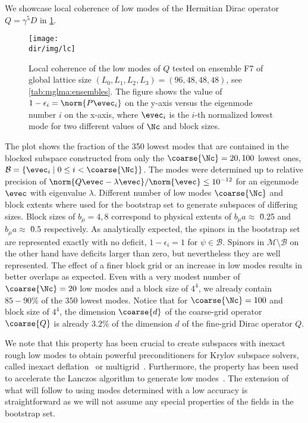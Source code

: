 We showcase local coherence of low modes of the Hermitian Dirac operator $Q = \gamma^{5} D$ in \cref{fig:lc}.
\begin{figure}
    \centering
    \texttt{[image: \\dir/img/lc]}
    \caption{Local coherence of the low modes of $Q$ tested on ensemble F7 of global lattice size $(L_0,L_1,L_2,L_3) = (96, 48, 48, 48)$, see \cref{tab:mglma:ensembles}. The figure shows the value of $1 - \epsilon_i = \norm{P \evec_i}$ on the y-axis versus the eigenmode number $i$ on the x-axis, where $\evec_i$ is the $i$-th normalized lowest mode for two different values of $\Nc$ and block sizes. \takenfull }
    \label{fig:lc}
\end{figure}
The plot shows the fraction of the \num{350} lowest modes that are contained in the blocked subspace constructed from only the $\coarse{\Nc} = 20, 100$ lowest ones, $\mathcal{B} = \{ \evec_i \mid 0 \leq i < \coarse{\Nc} \}$.
The modes were determined up to relative precision of $\norm{Q \evec - \lambda \evec}/\norm{\evec} \leq 10^{-12}$ for an eigenmode $\evec$ with eigenvalue $\lambda$.
Different number of low modes $\coarse{\Nc}$ and block extents where used for the bootstrap set to generate subspaces of differing sizes.
Block sizes of $b_{\mu} = 4, 8$ correspond to physical extents of $b_{\mu} a \approx $ \u{0.25}{\femto\metre} and $b_{\mu} a \approx $ \u{0.5}{\femto\metre} respectively.
As analytically expected, the spinors in the bootstrap set are represented exactly with no deficit, \ie $1 - \epsilon_i = 1$ for $\psi \in \mathcal{B}$.
Spinors in $\mathcal{M} \setminus \mathcal{B}$ on the other hand have deficits larger than zero, but nevertheless they are well represented.
The effect of a finer block grid or an increase in low modes results in better overlaps as expected.
Even with a very modest number of $\coarse{\Nc}=20$ low modes and a block size of $4^4$, we already contain $85-90\%$ of the $350$ lowest modes.
Notice that for $\coarse{\Nc}=100$ and block size of $4^4$, the dimension $\coarse{d}$ of the coarse-grid operator $\coarse{Q}$ is already $3.2\%$ of the dimension $d$ of the fine-grid Dirac operator $Q$.

We note that this property has been crucial to create subspaces with inexact rough low modes to obtain powerful preconditioners for Krylov subspace solvers, called inexact deflation~\cite{Luescher2007} or multigrid~\cite{Babich:2010qb}.
Furthermore, the property has been used to accelerate the Lanczos algorithm to generate low modes~\cite{Clark_2018}.
The extension of what will follow to using modes determined with a low accuracy is straightforward as we will not assume any special properties of the fields in the bootstrap set.

